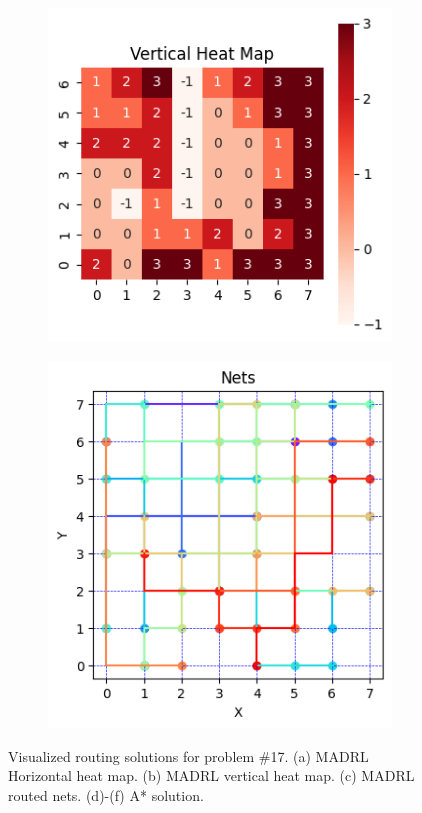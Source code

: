 \documentclass[conference]{IEEEtran}
\begin{document}
\begin{figure}[h!]
\begin{subfigure}[b]{0.31\textwidth}
        \caption{}
    \end{subfigure}
    \begin{subfigure}[b]{0.35\textwidth}
        \includegraphics[width=\textwidth]{figures/as_vhm.png}
        \caption{}
    \end{subfigure}
    \begin{subfigure}[b]{0.31\textwidth}
        \includegraphics[width=\textwidth]{figures/as_solution.png}
        \caption{}
    \end{subfigure}
    \caption{Visualized routing solutions for problem \#17. (a) MADRL Horizontal heat map. 
    (b) MADRL vertical heat map. (c) MADRL routed nets. (d)-(f) A* solution.}
    \label{fig:result}
\end{figure}
\end{document}
